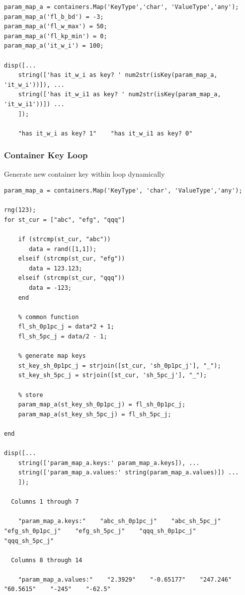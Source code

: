 \documentclass[
]{book}
\begin{document}
\begin{verbatim}
param_map_a = containers.Map('KeyType','char', 'ValueType','any');
param_map_a('fl_b_bd') = -3;
param_map_a('fl_w_max') = 50;
param_map_a('fl_kp_min') = 0;
param_map_a('it_w_i') = 100;

disp([...
    string(['has it_w_i as key? ' num2str(isKey(param_map_a, 'it_w_i'))]), ...
    string(['has it_w_i1 as key? ' num2str(isKey(param_map_a, 'it_w_i1'))]) ...
    ]);

    "has it_w_i as key? 1"    "has it_w_i1 as key? 0"
\end{verbatim}

\hypertarget{container-key-loop}{%
\subsubsection{Container Key Loop}\label{container-key-loop}}

Generate new container key within loop dynamically

\begin{verbatim}
param_map_a = containers.Map('KeyType', 'char', 'ValueType','any');

rng(123);
for st_cur = ["abc", "efg", "qqq"]

    if (strcmp(st_cur, "abc"))
       data = rand([1,1]);
    elseif (strcmp(st_cur, "efg"))
       data = 123.123;
    elseif (strcmp(st_cur, "qqq"))
       data = -123;
    end

    % common function
    fl_sh_0p1pc_j = data*2 + 1;
    fl_sh_5pc_j = data/2 - 1;

    % generate map keys
    st_key_sh_0p1pc_j = strjoin([st_cur, 'sh_0p1pc_j'], "_");
    st_key_sh_5pc_j = strjoin([st_cur, 'sh_5pc_j'], "_");

    % store
    param_map_a(st_key_sh_0p1pc_j) = fl_sh_0p1pc_j;
    param_map_a(st_key_sh_5pc_j) = fl_sh_5pc_j;

end

disp([...
    string(['param_map_a.keys:' param_map_a.keys]), ...
    string(['param_map_a.values:' string(param_map_a.values)]) ...
    ]);

  Columns 1 through 7

    "param_map_a.keys:"    "abc_sh_0p1pc_j"    "abc_sh_5pc_j"    "efg_sh_0p1pc_j"    "efg_sh_5pc_j"    "qqq_sh_0p1pc_j"    "qqq_sh_5pc_j"

  Columns 8 through 14

    "param_map_a.values:"    "2.3929"    "-0.65177"    "247.246"    "60.5615"    "-245"    "-62.5"
\end{verbatim}
\end{document}
